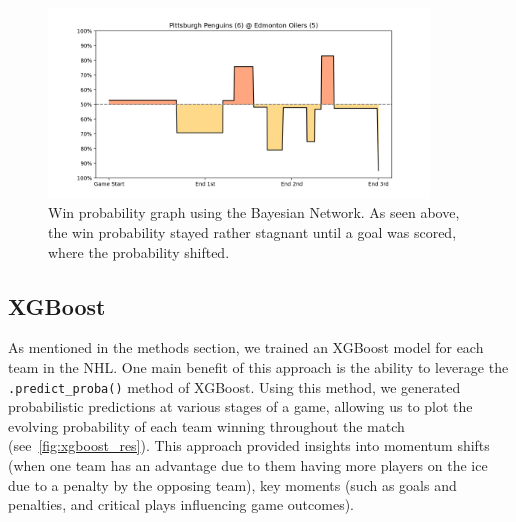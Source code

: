 \documentclass[11pt]{article}
\begin{document}
\begin{figure}[H]
    \centering
    \includegraphics[width=0.9\textwidth]{images/good_bayesian_example.png}
    \caption{Win probability graph using the Bayesian Network. As seen above, the win probability stayed rather stagnant until a goal was scored, where the probability shifted.}
    \label{fig:bayesian_graph}
\end{figure}

\subsection{XGBoost}

As mentioned in the methods section, we trained an XGBoost model for each team in the NHL. One main benefit of this
approach is the ability to leverage the {\tt .predict\_proba()} method of XGBoost.
Using this method, we generated 
probabilistic predictions at various stages of a game, allowing us to 
plot the evolving probability of each team winning throughout the match
(see~\ref{fig:xgboost_res}). 
This approach provided insights into momentum shifts (when one team 
has an advantage due to them having more players on the ice due to 
a penalty by the opposing team), key moments (such as goals and 
penalties, and critical plays influencing game outcomes).
\end{document}
